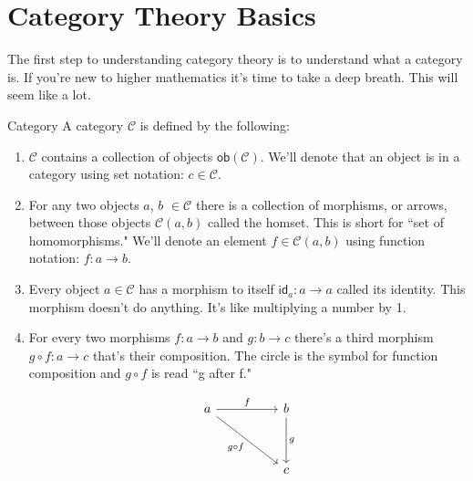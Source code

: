 \documentclass[12pt]{article}
\begin{document}
\section*{Category Theory Basics}
The first step to understanding category theory is to understand what a category is.
If you're new to higher mathematics it's time to take a deep breath.
This will seem like a lot.

\begin{definition}{Category}{}
    A category $\mathcal{C}$ is defined by the following:
    \begin{enumerate}
        \item $\mathcal{C}$ contains a collection of objects $\mathsf{ob}(\mathcal{C})$. We'll denote that an object is in a category using set notation: $c\in\mathcal{C}$.
        \item For any two objects $a$, $b$ $\in \mathcal{C}$ there is a collection of morphisms, or arrows, between those objects $\mathcal{C}(a,b)$ called the homset. This is short for ``set of homomorphisms." We'll denote an element $f\in\mathcal{C}(a,b)$ using function notation: $f:a\rightarrow b$.
        \item Every object $a\in \mathcal{C}$ has a morphism to itself $\mathsf{id}_a:a\rightarrow a$ called its identity. This morphism doesn't do anything. It's like multiplying a number by 1.
        \item For every two morphisms $f:a\rightarrow b$ and $g: b\rightarrow c$ there's a third morphism $g\circ f:a\rightarrow c$ that's their composition. The circle is the symbol for function composition and $g \circ f$ is read ``g after f."

              \[\begin{tikzcd}
                      a && b \\
                      \\
                      && c
                      \arrow["f", from=1-1, to=1-3]
                      \arrow["g", from=1-3, to=3-3]
                      \arrow["{g\circ f}"', from=1-1, to=3-3]
                  \end{tikzcd}\]

    \end{enumerate}
\end{definition}
\end{document}
